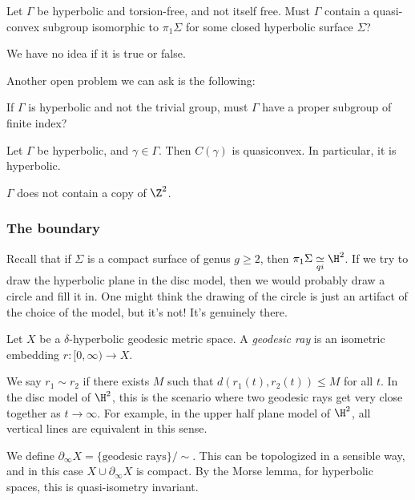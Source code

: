 \documentclass[a4paper]{article}
\newcommand{\qi}{\underset{qi}{\simeq}}
\begin{document}
\begin{question}
  Let $\Gamma$ be hyperbolic and torsion-free, and not itself free. Must $\Gamma$ contain a quasi-convex subgroup isomorphic to $\pi_1 \Sigma$ for some closed hyperbolic surface $\Sigma$?
\end{question}
We have no idea if it is true or false.

Another open problem we can ask is the following:
\begin{question}
  If $\Gamma$ is hyperbolic and not the trivial group, must $\Gamma$ have a proper subgroup of finite index?
\end{question}

\begin{prop}
  Let $\Gamma$ be hyperbolic, and $\gamma \in \Gamma$. Then $C(\gamma)$ is quasiconvex. In particular, it is hyperbolic.
\end{prop}

\begin{cor}
  $\Gamma$ does not contain a copy of $\Z^2$.
\end{cor}

\subsubsection*{The boundary}
Recall that if $\Sigma$ is a compact surface of genus $g \geq 2$, then $\pi_1 \Sigma \qi \H^2$. If we try to draw the hyperbolic plane in the disc model, then we would probably draw a circle and fill it in. One might think the drawing of the circle is just an artifact of the choice of the model, but it's not! It's genuinely there.

\begin{defi}
  Let $X$ be a $\delta$-hyperbolic geodesic metric space. A \emph{geodesic ray} is an isometric embedding $r: [0, \infty) \to X$.
\end{defi}

We say $r_1 \sim r_2$ if there exists $M$ such that $d(r_1(t), r_2(t)) \leq M$ for all $t$. In the disc model of $\H^2$, this is the scenario where two geodesic rays get very close together as $t \to \infty$. For example, in the upper half plane model of $\H^2$, all vertical lines are equivalent in this sense.

We define $\partial_\infty X = \{\text{geodesic rays}\}/\sim$. This can be topologized in a sensible way, and in this case $X \cup \partial_\infty X$ is compact. By the Morse lemma, for hyperbolic spaces, this is quasi-isometry invariant.
\end{document}

